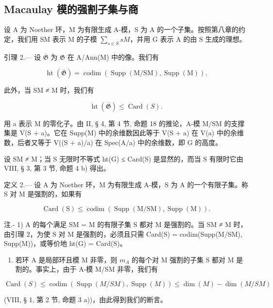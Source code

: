 \subsection{Macaulay 模的强割子集与商}

设 A 为 Noether 环，M 为有限生成 A-模，S 为 A 的一个子集。按照第八章的约定，我们用 SM 表示 M 的子模 \(\sum_{s\in S}sM\)，并用 G 表示 A 的由 S 生成的理想。

引理 2.--- 设 \(\overline{\mathfrak{G}}\) 为 \(\mathfrak{G}\) 在 A/Ann(M) 中的像。我们有

\[
\operatorname{ht} (\overline {{\mathfrak {G}}}) = \operatorname{codim} (\operatorname{Supp} (\mathrm{M} / \mathrm{SM}), \operatorname{Supp} (\mathrm{M})) .
\]

此外，当 SM ≠ M 时，我们有

\[
\operatorname{ht} (\overline {{{\mathfrak {G}}}}) \leqslant \operatorname{Card} (S).
\]

用 a 表示 M 的零化子。由 II, § 4, 第 4 节, 命题 18 的推论，A-模 M/SM 的支撑集是 V(S + a)。它在 Supp(M) 中的余维数因此等于 V(S + a) 在 V(a) 中的余维数，后者又等于 V((S + a)/a) 在 Spec(A/a) 中的余维数，即 G 的高度。

设 SM ≠ M；当 S 无限时不等式 ht(G) ≤ Card(S) 是显然的，而当 S 有限时它由 VIII, § 3, 第 3 节, 命题 4 b) 得出。

定义 2.--- 设 A 为 Noether 环，M 为有限生成 A-模，S 为 A 的一个有限子集。称 S 对 M 是强割的，如果有

\[
\operatorname{Card} (\mathrm{S}) \leqslant \operatorname{codim} (\operatorname{Supp} (\mathrm{M} / \mathrm{SM}), \operatorname{Supp} (\mathrm{M})) .
\]

注.- 1) A 的每个满足 SM = M 的有限子集 S 都对 M 是强割的。当 SM ≠ M 时，由引理 2，为使 S 对 M 是强割的，必须且只需 Card(S) = codim(Supp(M/SM), Supp(M))，或等价地 ht(G) = Card(S)。

\begin{enumerate}
\def\labelenumi{\arabic{enumi})}
\setcounter{enumi}{1}
\tightlist
\item
  若环 A 是局部环且模 M 非零，则 \(m_{A}\) 的每个对 M 强割的子集 S 都对 M 是割的。事实上，由于 A-模 M/SM 非零，我们有
\end{enumerate}

\[
\operatorname{Card} (S) \leqslant \operatorname{codim} (\operatorname{Supp} (M / S M), \operatorname{Supp} (M)) \leqslant \dim (M) - \dim (M / S M)
\]

(VIII, § 1, 第 2 节, 命题 3 a))，由此得到我们的断言。


